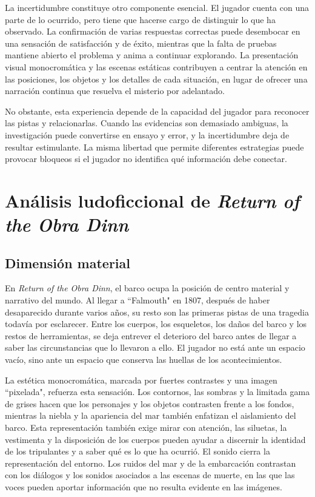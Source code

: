 \documentclass[12pt,a4paper]{article}
\begin{document}
La incertidumbre constituye otro componente esencial. El jugador cuenta con una parte de lo ocurrido, pero tiene que hacerse cargo de distinguir lo que ha observado. La confirmación de varias respuestas correctas puede desembocar en una sensación de satisfacción y de éxito, mientras que la falta de pruebas mantiene abierto el problema y anima a continuar explorando. La presentación visual monocromática y las escenas estáticas contribuyen a centrar la atención en las posiciones, los objetos y los detalles de cada situación, en lugar de ofrecer una narración continua que resuelva el misterio por adelantado.

No obstante, esta experiencia depende de la capacidad del jugador para reconocer las pistas y relacionarlas. Cuando las evidencias son demasiado ambiguas, la investigación puede convertirse en ensayo y error, y la incertidumbre deja de resultar estimulante. La misma libertad que permite diferentes estrategias puede provocar bloqueos si el jugador no identifica qué información debe conectar.

\section{Análisis ludoficcional de \textit{Return of the Obra Dinn}}
\subsection{Dimensión material}
En \textit{Return of the Obra Dinn}, el barco ocupa la posición de centro material y narrativo del mundo. Al llegar a ``Falmouth" en 1807, después de haber desaparecido durante varios años, su resto son las primeras pistas de una tragedia todavía por esclarecer. Entre los cuerpos, los esqueletos, los daños del barco y los restos de herramientas, se deja entrever el deterioro del barco antes de llegar a saber las circunstancias que lo llevaron a ello. El jugador no está ante un espacio vacío, sino ante un espacio que conserva las huellas de los acontecimientos.

La estética monocromática, marcada por fuertes contrastes y una imagen ``pixelada", refuerza esta sensación. Los contornos, las sombras y la limitada  gama de grises hacen que los personajes y los objetos contrasten frente a los fondos, mientras la niebla y la apariencia del mar también enfatizan el aislamiento del barco. Esta representación también exige mirar con atención, las siluetas, la vestimenta y la disposición de los cuerpos pueden ayudar a discernir la identidad de los tripulantes y a saber qué es lo que ha ocurrió. El sonido cierra la representación del entorno. Los ruidos del mar y de la embarcación contrastan con los diálogos y los sonidos asociados a las escenas de muerte, en las que las voces pueden aportar información que no resulta evidente en las imágenes.
\end{document}
